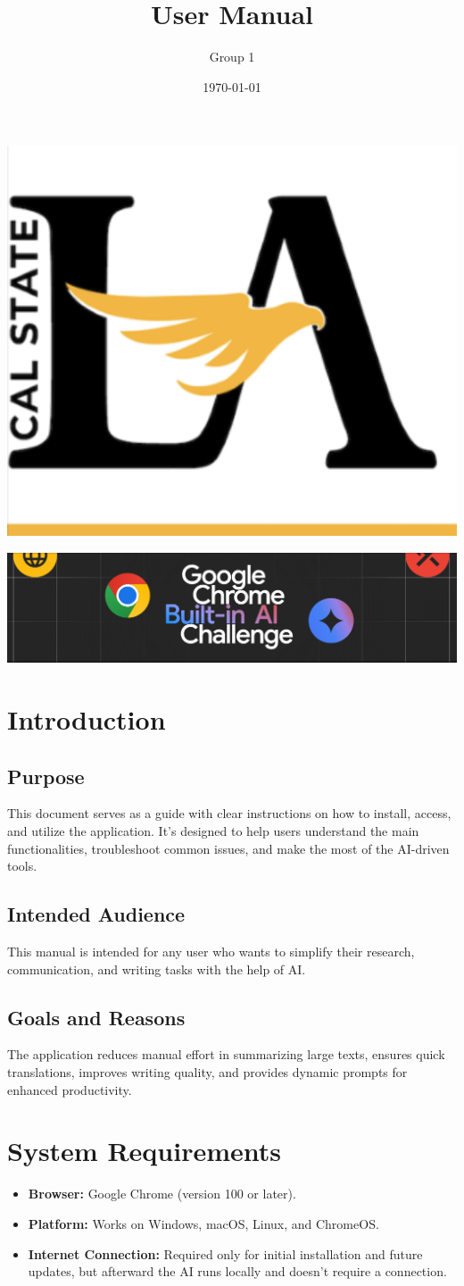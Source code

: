 \documentclass{article}
\title{User Manual}
\author{Group 1 }
\date{\today}
\begin{document}
\maketitle  
\pagebreak

\tableofcontents
\pagebreak

\includegraphics[width=0.3\linewidth]{../logo/csula.png} 

\includegraphics[width=0.3\linewidth]{../logo/chromeai.png} 
\section{Introduction}
\subsection{Purpose}
This document serves as a guide with clear instructions on how to install, access, and utilize the application. It's designed to help users understand the main functionalities, troubleshoot common issues, and make the most of the AI-driven tools.

\subsection{Intended Audience}
This manual is intended for any user who wants to simplify their research, communication, and writing tasks with the help of AI.

\subsection{Goals and Reasons}
The application reduces manual effort in summarizing large texts, ensures quick translations, improves writing quality, and provides dynamic prompts for enhanced productivity.

\section{System Requirements}
\begin{itemize}
    \item \textbf{Browser:} Google Chrome (version 100 or later).
    \item \textbf{Platform:} Works on Windows, macOS, Linux, and ChromeOS.
    \item \textbf{Internet Connection:} Required only for initial installation and future updates, but afterward the AI runs locally and doesn't require a connection.
\end{itemize}
\end{document}
